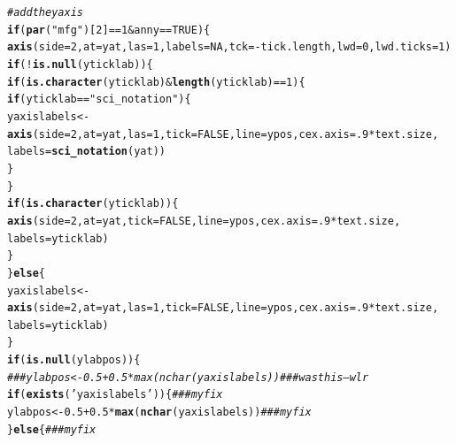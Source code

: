 \documentclass{article}\usepackage[]{graphicx}\usepackage[]{color}
\makeatletter
\newcommand{\hlnum}[1]{\textcolor[rgb]{0.686,0.059,0.569}{#1}}%
\newcommand{\hlstr}[1]{\textcolor[rgb]{0.192,0.494,0.8}{#1}}%
\newcommand{\hlcom}[1]{\textcolor[rgb]{0.678,0.584,0.686}{\textit{#1}}}%
\newcommand{\hlopt}[1]{\textcolor[rgb]{0,0,0}{#1}}%
\newcommand{\hlstd}[1]{\textcolor[rgb]{0.345,0.345,0.345}{#1}}%
\newcommand{\hlkwa}[1]{\textcolor[rgb]{0.161,0.373,0.58}{\textbf{#1}}}%
\newcommand{\hlkwb}[1]{\textcolor[rgb]{0.69,0.353,0.396}{#1}}%
\newcommand{\hlkwc}[1]{\textcolor[rgb]{0.333,0.667,0.333}{#1}}%
\newcommand{\hlkwd}[1]{\textcolor[rgb]{0.737,0.353,0.396}{\textbf{#1}}}%
\newenvironment{kframe}{%
 \def\at@end@of@kframe{}%
 \ifinner\ifhmode%
  \def\at@end@of@kframe{\end{minipage}}%
  \begin{minipage}{\columnwidth}%
 \fi\fi%
 \def\FrameCommand##1{\hskip\@totalleftmargin \hskip-\fboxsep
 \colorbox{shadecolor}{##1}\hskip-\fboxsep
     \hskip-\linewidth \hskip-\@totalleftmargin \hskip\columnwidth}%
 \MakeFramed {\advance\hsize-\width
   \@totalleftmargin\z@ \linewidth\hsize
   \@setminipage}}%
 {\par\unskip\endMakeFramed%
 \at@end@of@kframe}
\newenvironment{knitrout}{}{} %
\makeatother
\begin{document}
\begin{knitrout}
\begin{kframe}
\begin{alltt}
    \hlcom{# add the y axis}
    \hlkwa{if} \hlstd{(}\hlkwd{par}\hlstd{(}\hlstr{"mfg"}\hlstd{)[}\hlnum{2}\hlstd{]} \hlopt{==} \hlnum{1} \hlopt{&} \hlstd{anny} \hlopt{==} \hlnum{TRUE}\hlstd{) \{}
      \hlkwd{axis}\hlstd{(}\hlkwc{side} \hlstd{=} \hlnum{2}\hlstd{,} \hlkwc{at} \hlstd{= yat,} \hlkwc{las} \hlstd{=} \hlnum{1}\hlstd{,} \hlkwc{labels} \hlstd{=} \hlnum{NA}\hlstd{,} \hlkwc{tck} \hlstd{=} \hlopt{-}\hlstd{tick.length,} \hlkwc{lwd} \hlstd{=} \hlnum{0}\hlstd{,} \hlkwc{lwd.ticks} \hlstd{=} \hlnum{1}\hlstd{)}
      \hlkwa{if} \hlstd{(}\hlopt{!}\hlkwd{is.null}\hlstd{(yticklab)) \{}
        \hlkwa{if} \hlstd{(}\hlkwd{is.character}\hlstd{(yticklab)} \hlopt{&} \hlkwd{length}\hlstd{(yticklab)} \hlopt{==} \hlnum{1}\hlstd{) \{}
          \hlkwa{if} \hlstd{(yticklab} \hlopt{==} \hlstr{"sci_notation"}\hlstd{) \{}
            \hlstd{yaxislabels} \hlkwb{<-} \hlkwd{axis}\hlstd{(}\hlkwc{side} \hlstd{=} \hlnum{2}\hlstd{,} \hlkwc{at} \hlstd{= yat,} \hlkwc{las} \hlstd{=} \hlnum{1}\hlstd{,} \hlkwc{tick} \hlstd{=} \hlnum{FALSE}\hlstd{,} \hlkwc{line} \hlstd{= ypos,} \hlkwc{cex.axis} \hlstd{=}  \hlnum{.9}\hlopt{*}\hlstd{text.size,}
                                \hlkwc{labels} \hlstd{=} \hlkwd{sci_notation}\hlstd{(yat))}
          \hlstd{\}}
        \hlstd{\}}
        \hlkwa{if} \hlstd{(}\hlkwd{is.character}\hlstd{(yticklab)) \{}
          \hlkwd{axis}\hlstd{(}\hlkwc{side} \hlstd{=} \hlnum{2}\hlstd{,} \hlkwc{at} \hlstd{= yat,} \hlkwc{tick} \hlstd{=} \hlnum{FALSE}\hlstd{,} \hlkwc{line} \hlstd{= ypos,} \hlkwc{cex.axis} \hlstd{=}  \hlnum{.9}\hlopt{*}\hlstd{text.size,}
               \hlkwc{labels} \hlstd{= yticklab)}
        \hlstd{\}}
      \hlstd{\}} \hlkwa{else} \hlstd{\{}
        \hlstd{yaxislabels} \hlkwb{<-} \hlkwd{axis}\hlstd{(}\hlkwc{side} \hlstd{=} \hlnum{2}\hlstd{,} \hlkwc{at} \hlstd{= yat,} \hlkwc{las} \hlstd{=} \hlnum{1}\hlstd{,} \hlkwc{tick} \hlstd{=} \hlnum{FALSE}\hlstd{,} \hlkwc{line} \hlstd{= ypos,} \hlkwc{cex.axis} \hlstd{=}  \hlnum{.9}\hlopt{*}\hlstd{text.size,}
                            \hlkwc{labels} \hlstd{= yticklab)}
      \hlstd{\}}
      \hlkwa{if} \hlstd{(}\hlkwd{is.null}\hlstd{(ylabpos)) \{}
        \hlcom{### ylabpos <- 0.5 + 0.5*max(nchar(yaxislabels))  ### was this ---wlr}
        \hlkwa{if}\hlstd{(}\hlkwd{exists}\hlstd{(}\hlstr{'yaxislabels'}\hlstd{))\{}                        \hlcom{### my fix}
          \hlstd{ylabpos} \hlkwb{<-} \hlnum{0.5} \hlopt{+} \hlnum{0.5}\hlopt{*}\hlkwd{max}\hlstd{(}\hlkwd{nchar}\hlstd{(yaxislabels))}    \hlcom{### my fix}
        \hlstd{\}} \hlkwa{else}\hlstd{\{}                                           \hlcom{### my fix}

\end{alltt}
\end{kframe}
\end{knitrout}
\end{document}
